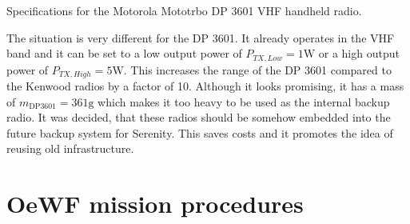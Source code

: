 \vfill%
\begin{table}[h!]
	\centering
	
	\caption{Specifications for the Motorola Mototrbo DP 3601 VHF handheld radio.}
	\label{tab:table_dp3601_specs}
\end{table}
\vfill%

The situation is very different for the DP 3601. It already operates in the VHF band and it can be set to a low output power of $P_{TX, Low} = 1\mathrm{W}$ or a high output power of $P_{TX, High} = 5\mathrm{W}$. This increases the range of the DP 3601 compared to the Kenwood radios by a factor of 10. Although it looks promising, it has a mass of $m_{\mathrm{DP 3601}} = 361\mathrm{g}$ which makes it too heavy to be used as the internal backup radio. It was decided, that these radios should be somehow embedded into the future backup system for Serenity. This saves costs and it promotes the idea of reusing old infrastructure.

\section{OeWF mission procedures}

